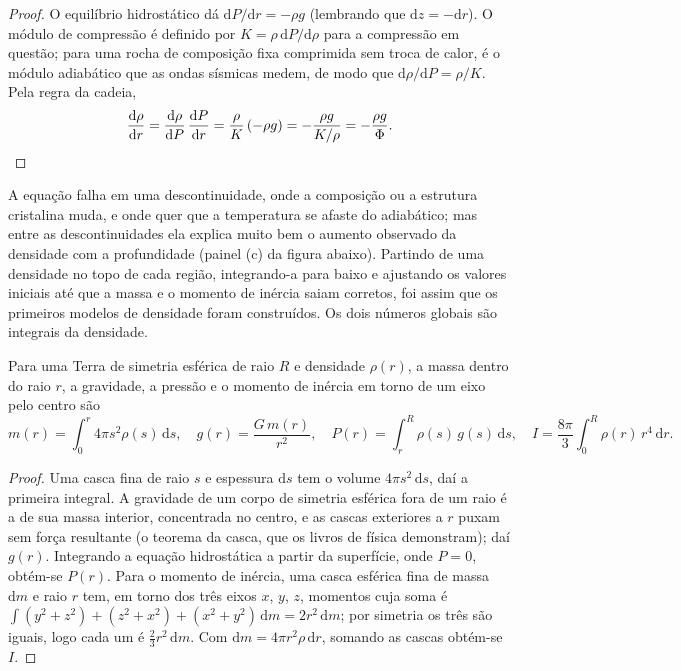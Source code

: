 \begin{proof}
O equilíbrio hidrostático dá $\mathrm dP/\mathrm dr = -\rho g$ (lembrando que $\mathrm dz = -\mathrm dr$). O módulo de compressão é definido por $K = \rho\,\mathrm dP/\mathrm d\rho$ para a compressão em questão; para uma rocha de composição fixa comprimida sem troca de calor, é o módulo adiabático que as ondas sísmicas medem, de modo que $\mathrm d\rho/\mathrm dP = \rho/K$. Pela regra da cadeia,
\[
  \frac{\mathrm d\rho}{\mathrm dr} = \frac{\mathrm d\rho}{\mathrm dP}\,
  \frac{\mathrm dP}{\mathrm dr} = \frac{\rho}{K}\,(-\rho g) = -\frac{\rho g}{K/\rho}
  = -\frac{\rho g}{\Phi}. \qedhere
\]
\end{proof}

A equação falha em uma descontinuidade, onde a composição ou a estrutura cristalina muda, e onde quer que a temperatura se afaste do adiabático; mas entre as descontinuidades ela explica muito bem o aumento observado da densidade com a profundidade (painel (c) da figura abaixo). Partindo de uma densidade no topo de cada região, integrando-a para baixo e ajustando os valores iniciais até que a massa e o momento de inércia saiam corretos, foi assim que os primeiros modelos de densidade foram construídos. Os dois números globais são integrais da densidade.

\begin{proposition}
\label{prop:b1:layered-earth:integrals}
Para uma Terra de simetria esférica de raio $R$ e densidade $\rho(r)$, a massa dentro do raio $r$, a gravidade, a pressão e o momento de inércia em torno de um eixo pelo centro são
\[
  m(r) = \int_0^r 4\pi s^2\rho(s)\,\mathrm ds, \quad
  g(r) = \frac{G\,m(r)}{r^2}, \quad
  P(r) = \int_r^R \rho(s)\,g(s)\,\mathrm ds, \quad
  I = \frac{8\pi}{3}\int_0^R \rho(r)\,r^4\,\mathrm dr.
\]
\end{proposition}

\begin{proof}
Uma casca fina de raio $s$ e espessura $\mathrm ds$ tem o volume $4\pi s^2\,\mathrm ds$, daí a primeira integral. A gravidade de um corpo de simetria esférica fora de um raio é a de sua massa interior, concentrada no centro, e as cascas exteriores a $r$ puxam sem força resultante (o teorema da casca,
  que os livros de física demonstram); daí $g(r)$. Integrando a equação hidrostática a partir da superfície, onde $P = 0$, obtém-se $P(r)$. Para o momento de inércia, uma casca esférica fina de massa $\mathrm dm$ e raio $r$ tem, em torno dos três eixos $x$, $y$, $z$, momentos cuja soma é
$\int (y^2 + z^2) + (z^2 + x^2) + (x^2 + y^2)\,\mathrm dm = 2r^2\,\mathrm dm$;
por simetria os três são iguais, logo cada um é $\tfrac23 r^2\,\mathrm dm$. Com $\mathrm dm = 4\pi r^2\rho\,\mathrm dr$, somando as cascas obtém-se $I$.
\end{proof}

